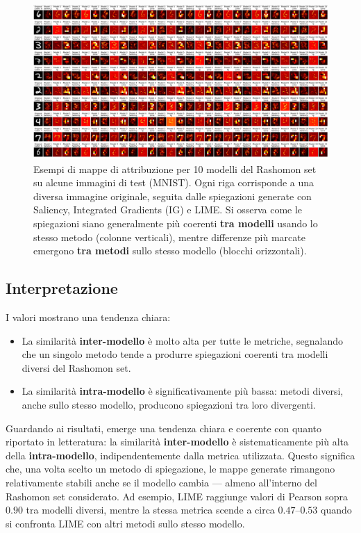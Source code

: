 \documentclass{article}
\begin{document}
\begin{figure}[h!]
    \centering
    \includegraphics[width=\textwidth]{images/visualizzazione (2).png}
    \caption{Esempi di mappe di attribuzione per 10 modelli del Rashomon set su alcune immagini di test (MNIST). 
    Ogni riga corrisponde a una diversa immagine originale, seguita dalle spiegazioni generate con Saliency, Integrated Gradients (IG) e LIME.
    Si osserva come le spiegazioni siano generalmente più coerenti \textbf{tra modelli} usando lo stesso metodo (colonne verticali), 
    mentre differenze più marcate emergono \textbf{tra metodi} sullo stesso modello (blocchi orizzontali).}
    \label{fig:similarity_examples}
\end{figure}

\subsection{Interpretazione}
I valori mostrano una tendenza chiara:
\begin{itemize}
      \item La similarità \textbf{inter-modello} è molto alta per tutte le metriche,
            segnalando che un singolo metodo tende a produrre spiegazioni coerenti tra
            modelli diversi del Rashomon set.
      \item La similarità \textbf{intra-modello} è significativamente più bassa: metodi
            diversi, anche sullo stesso modello, producono spiegazioni tra loro divergenti.
\end{itemize}

Guardando ai risultati, emerge una tendenza chiara e coerente con quanto
riportato in letteratura: la similarità \textbf{inter-modello} è
sistematicamente più alta della \textbf{intra-modello}, indipendentemente dalla
metrica utilizzata. Questo significa che, una volta scelto un metodo di
spiegazione, le mappe generate rimangono relativamente stabili anche se il
modello cambia — almeno all’interno del Rashomon set considerato. Ad esempio,
LIME raggiunge valori di Pearson sopra $0.90$ tra modelli diversi, mentre la
stessa metrica scende a circa $0.47$–$0.53$ quando si confronta LIME con altri
metodi sullo stesso modello.\\
\end{document}

